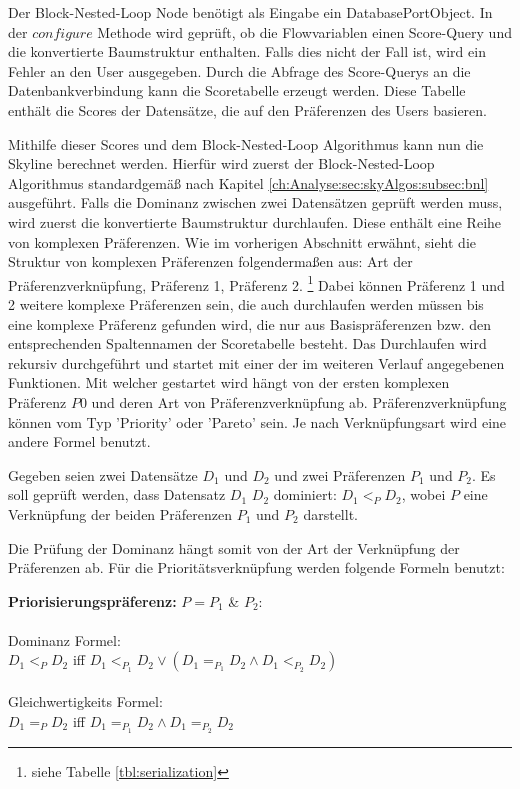 Der Block-Nested-Loop Node benötigt als Eingabe ein DatabasePortObject. In der $configure$ Methode wird geprüft, ob die Flowvariablen einen Score-Query und die konvertierte Baumstruktur enthalten. Falls dies nicht der Fall ist, wird ein Fehler an den User ausgegeben.
Durch die Abfrage des Score-Querys an die Datenbankverbindung kann die Scoretabelle erzeugt werden. Diese Tabelle enthält die Scores der Datensätze, die auf den Präferenzen des Users basieren.

Mithilfe dieser Scores und dem Block-Nested-Loop Algorithmus kann nun die Skyline berechnet werden.
Hierfür wird zuerst der Block-Nested-Loop Algorithmus standardgemäß nach Kapitel \ref{ch:Analyse:sec:skyAlgos:subsec:bnl} ausgeführt. Falls die Dominanz zwischen zwei Datensätzen geprüft werden muss, wird zuerst die konvertierte Baumstruktur durchlaufen. Diese enthält eine Reihe von komplexen Präferenzen.
Wie im vorherigen Abschnitt erwähnt, sieht die Struktur von komplexen Präferenzen folgendermaßen aus: Art der Präferenzverknüpfung, Präferenz 1, Präferenz 2. \footnote{siehe Tabelle \ref{tbl:serialization}}
Dabei können Präferenz 1 und 2 weitere komplexe Präferenzen sein, die auch durchlaufen werden müssen bis eine komplexe Präferenz gefunden wird, die nur aus Basispräferenzen bzw. den entsprechenden Spaltennamen der Scoretabelle besteht.
Das Durchlaufen wird rekursiv durchgeführt und startet mit einer der im weiteren Verlauf angegebenen Funktionen. Mit welcher gestartet wird hängt von der ersten komplexen Präferenz $P0$ und deren Art von Präferenzverknüpfung ab.
Präferenzverknüpfung können vom Typ 'Priority' oder 'Pareto' sein. Je nach Verknüpfungsart wird eine andere Formel benutzt.

Gegeben seien zwei Datensätze $D_1$ und $D_2$ und zwei Präferenzen $P_1$ und $P_2$.
Es soll geprüft werden, dass Datensatz $D_1$ $D_2$ dominiert: $D_1 <_P D_2$, wobei $P$ eine Verknüpfung der beiden Präferenzen $P_1$ und $P_2$ darstellt.

Die Prüfung der Dominanz hängt somit von der Art der Verknüpfung der Präferenzen ab. Für die Prioritätsverknüpfung werden folgende Formeln benutzt:

\textbf{Priorisierungspräferenz:} $P = P_1$ \& $P_2:$ \\ \\
Dominanz Formel: \\
$D_1 <_P D_2$ iff $D_1 <_{P_1} D_2 \lor (D_1 =_{P_1} D_2 \land D_1 <_{P_2} D_2)$ \\ \\
Gleichwertigkeits Formel: \\
$D_1 =_P D_2$ iff $D_1 =_{P_1} D_2 \land D_1 =_{P_2} D_2$ \\

